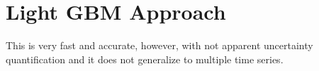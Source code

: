 \chapter{Light GBM Approach}

This is very fast and accurate, however, with not apparent uncertainty quantification and it does not generalize to multiple time series.